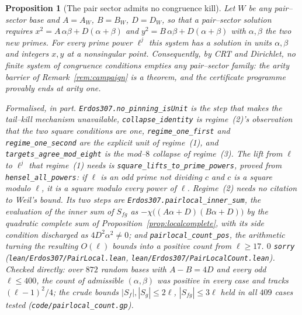 \documentclass[11pt]{article}
\newtheorem{proposition}[theorem]{Proposition}
\theoremstyle{definition}
\begin{document}
\begin{proposition}[The pair sector admits no congruence kill]\label{prop:pairlocal}
Let $W$ be any pair--sector base and $A=A_W$, $B=B_W$, $D=D_W$, so that a pair--sector solution
requires $x^2=A\,\alpha\beta+D(\alpha+\beta)$ and $y^2=B\,\alpha\beta+D(\alpha+\beta)$ with
$\alpha,\beta$ the two new primes. For every prime power $\ell^j$ this system has a solution in
units $\alpha,\beta$ and integers $x,y$ at a nonsingular point. Consequently, by CRT and Dirichlet,
no finite system of congruence conditions empties any pair--sector family: the arity barrier of
Remark~\ref{rem:campaign} is a theorem, and the certificate programme provably ends at arity one.

\textup{Formalised, in part.} \texttt{Erdos307.no\_pinning\_isUnit} is the step that makes the
tail--kill mechanism unavailable, \texttt{collapse\_identity} is regime~\textup{(2)}'s
observation that the two square conditions are one, \texttt{regime\_one\_first} and
\texttt{regime\_one\_second} are the explicit unit of regime~\textup{(1)}, and
\texttt{targets\_agree\_mod\_eight} is the mod--$8$ collapse of regime~\textup{(3)}. The lift from
$\ell$ to $\ell^j$ that regime~\textup{(1)} needs is \texttt{square\_lifts\_to\_prime\_powers},
proved from \texttt{hensel\_all\_powers}: if $\ell$ is an odd prime not dividing $c$ and $c$ is a
square modulo $\ell$, it is a square modulo every power of $\ell$. Regime~\textup{(2)} needs no citation to Weil's bound. Its two steps are
\texttt{Erdos307.pairlocal\_inner\_sum}, the evaluation of the inner sum of $S_{fg}$ as
$-\chi\bigl((A\alpha+D)(B\alpha+D)\bigr)$ by the quadratic complete sum of
Proposition~\ref{prop:localcomplete}, with its side condition discharged as $4D^2\alpha^2\ne0$; and
\texttt{pairlocal\_count\_pos}, the arithmetic turning the resulting $O(\ell)$ bounds into a positive
count from $\ell\ge17$. $0$ \texttt{sorry} \textup{(\texttt{lean/Erdos307/PairLocal.lean},
\texttt{lean/Erdos307/PairLocalCount.lean})}. Checked directly: over $872$ random bases with
$A-B=4D$ and every odd $\ell\le400$, the count of admissible $(\alpha,\beta)$ was positive in every
case and tracks $(\ell-1)^2/4$; the crude bounds $|S_f|,|S_g|\le2\ell$, $|S_{fg}|\le3\ell$ held in
all $409$ cases tested \textup{(\texttt{code/pairlocal\_count.gp})}.
\end{proposition}
\end{document}
